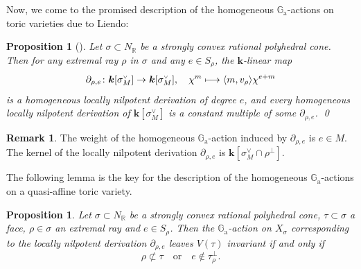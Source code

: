 \documentclass[JEP,XML,SOM,Unicode]{cedram}
\def\mto{\mathchoice{\longmapsto}{\mapsto}{\mapsto}{\mapsto}}
\newcommand{\ra}{\mathrm{a}}
\let\oldvee\vee
\renewcommand{\vee}{{\scriptscriptstyle\oldvee}}
\let\oldbot\bot
\renewcommand{\bot}{{\scriptscriptstyle\oldbot}}
\theoremstyle{plain}
\newtheorem{proposition}[theorem]{Proposition}
\theoremstyle{definition}
\newtheorem{remark}[theorem]{Remark}
\newcommand{\GG}{\mathbb{G}}
\newcommand{\RR}{\mathbb{R}}
\newcommand{\kk}{{\boldsymbol{k}}}
\newcommand{\name}[1]{#1}
\begin{document}
Now, we come to the promised description
of the homogeneous $\GG_\ra$-actions on toric varieties due to \name{Liendo}:

\begin{proposition}[{\cite[Lem.\,2.6, Th.\,2.7]{Li2010Affine-Bbb-T-varie}}]
\label{prop.G_a-actions_on_affine_toric_var}
Let $\sigma \subset N_\RR$ be a strongly convex rational polyhedral cone.
Then for any extremal ray $\rho$ in $\sigma$ and any
$e \in S_\rho$, the $\kk$-linear map
\[
\partial_{\rho, e} \colon \kk[\sigma^\vee_M] \to \kk[\sigma^\vee_M]
, \quad
\chi^m \mto \langle m, v_\rho \rangle \chi^{e+m}
\]
is a homogeneous locally nilpotent derivation of degree $e$,
and every homogeneous locally nilpotent derivation of $\kk[\sigma^\vee_M]$
is a constant multiple of some $\partial_{\rho, e}$. \qed
\end{proposition}

\begin{remark}
The weight of the homogeneous $\GG_\ra$-action induced by $\partial_{\rho, e}$ is $e \in M$.
The kernel of the locally nilpotent derivation $\partial_{\rho, e}$ is $\kk[\sigma_M^\vee \cap \rho^\bot]$.
\end{remark}

The following lemma is the key for the description of the homogeneous $\GG_\ra$-actions on a
quasi-affine toric variety.

\begin{proposition}
\label{Prop:Orbit_closure_invariant}
Let $\sigma \subset N_{\RR}$ be a strongly convex rational polyhedral cone, $\tau \subset \sigma$ a face,
$\rho \in \sigma$ an extremal ray and $e \in S_\rho$. Then the
$\GG_\ra$-action on $X_\sigma$ corresponding to the locally nilpotent derivation $\partial_{\rho, e}$
leaves $V(\tau)$ invariant if and only if
\[
\rho \not\subset \tau \quad \textrm{or} \quad e \not\in \tau_{\rho}^\bot.
\]
\end{proposition}
\end{document}
